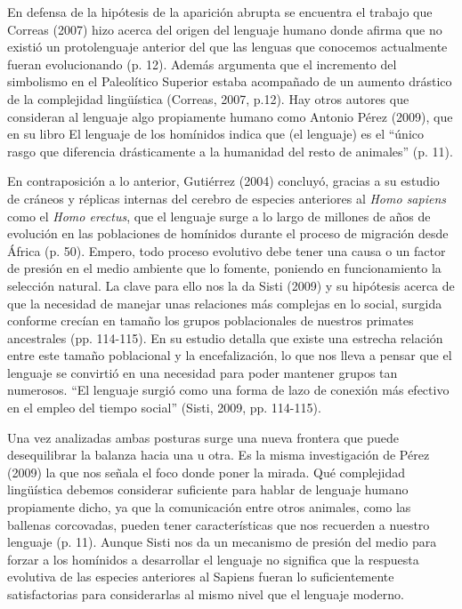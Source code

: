 \documentclass[12pt, a4paper, oneside]{report}
\begin{document}
            En defensa de la hipótesis de la aparición abrupta se encuentra el trabajo que Correas (2007) hizo
            acerca del origen del lenguaje humano donde afirma que no existió un protolenguaje anterior del
            que las lenguas que conocemos actualmente fueran evolucionando (p. 12). Además argumenta que
            el incremento del simbolismo en el Paleolítico Superior estaba acompañado de un aumento drástico
            de la complejidad lingüística (Correas, 2007, p.12). Hay otros autores que consideran al lenguaje
            algo propiamente humano como Antonio Pérez (2009), que en su libro El lenguaje de los homínidos
            indica que (el lenguaje) es el “único rasgo que diferencia drásticamente a la humanidad del resto
            de animales” (p. 11).

            En contraposición a lo anterior, Gutiérrez (2004) concluyó, gracias a su estudio de cráneos y
            réplicas internas del cerebro de especies anteriores al \emph{Homo sapiens} como el \emph{Homo
            erectus}, que el lenguaje surge a lo largo de millones de años de evolución en las poblaciones de
            homínidos durante el proceso de migración desde África (p. 50). Empero, todo proceso evolutivo
            debe tener una causa o un factor de presión en el medio ambiente que lo fomente, poniendo en
            funcionamiento la selección natural. La clave para ello nos la da Sisti (2009) y su hipótesis
            acerca de que la necesidad de manejar unas relaciones más complejas en lo social, surgida conforme
            crecían en tamaño los grupos poblacionales de nuestros primates ancestrales (pp. 114-115). En
            su estudio detalla que existe una estrecha relación entre este tamaño poblacional y la
            encefalización, lo que nos lleva a pensar que el lenguaje se convirtió en una necesidad para
            poder mantener grupos tan numerosos. ``El lenguaje surgió como una forma de lazo de conexión
            más efectivo en el empleo del tiempo social'' (Sisti, 2009, pp. 114-115).

            Una vez analizadas ambas posturas surge una nueva frontera que puede desequilibrar la balanza
            hacia una u otra. Es la misma investigación de Pérez (2009) la que nos señala el foco donde poner la
            mirada. Qué complejidad lingüística debemos considerar suficiente para hablar de lenguaje humano
            propiamente dicho, ya que la comunicación entre otros animales, como las ballenas corcovadas,
            pueden tener características que nos recuerden a nuestro lenguaje (p. 11). Aunque Sisti nos
            da un mecanismo de presión del medio para forzar a los homínidos a desarrollar el lenguaje no
            significa que la respuesta evolutiva de las especies anteriores al Sapiens fueran lo
            suficientemente satisfactorias para considerarlas al mismo nivel que el lenguaje moderno.
        \clearpage
\end{document}
